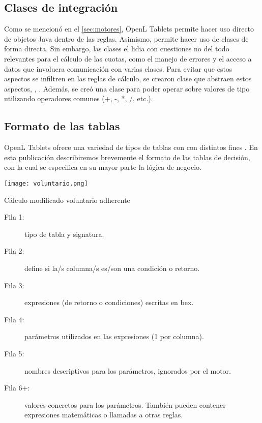 \subsection{Clases de integración}\label{ssec:integracion:clases}

Como se mencionó en el \cref{sec:motores}, OpenL Tablets permite hacer uso directo de objetos Java dentro de las reglas. 
Asimismo, permite hacer uso de clases de forma directa.
Sin embargo, las clases el {\SIDOSPU} lidia con cuestiones no del todo relevantes para el cálculo de las cuotas, como el manejo de errores y el acceso a datos que involucra comunicación con varias clases. Para evitar que estos aspectos se infiltren en las reglas de cálculo, se crearon clase que abstraen estos aspectos, , . Además, se creó una clase  para poder operar sobre valores de tipo  utilizando operadores comunes (+, -, *, /, etc.).

\subsection{Formato de las tablas}


OpenL Tablets ofrece una variedad de tipos de tablas con con distintos fines \cite{openl-decision-table}.
En esta publicación describiremos brevemente el formato de las tablas de decisión, con la cual se especifica en su mayor parte la lógica de negocio.

\begin{table*}[h]
    \centering
    \texttt{[image: voluntario.png]}
    \caption{Cálculo modificado voluntario adherente}
    \label{tbl:cambio:original}
\end{table*}

\begin{description}
    \item[Fila 1: ] tipo de tabla y signatura.
    \item[Fila 2: ] define si la/s columna/s es/son una condición o retorno.
    \item[Fila 3: ] expresiones (de retorno o condiciones) escritas en \acrshort{bex}.
    \item[Fila 4: ] parámetros utilizados en las expresiones (1 por columna).
    \item[Fila 5: ] nombres descriptivos para los parámetros, ignorados por el motor.
    \item[Fila 6+:] valores concretos para los parámetros. También pueden contener expresiones matemáticas o llamadas a otras reglas.
\end{description}

